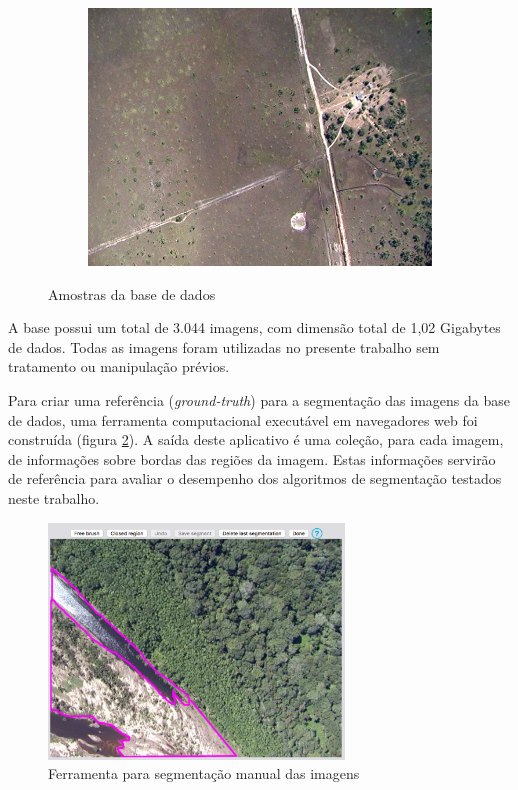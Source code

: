 \begin{figure}[h]
\begin{subfigure}[b]{0.3\textwidth}
    \includegraphics[width=\textwidth]{imgs/amostra3}
  \end{subfigure}%
  \caption{Amostras da base de dados}
  \label{fig:amostra}
\end{figure}

A base possui um total de 3.044 imagens, com dimensão total de 1,02 Gigabytes de dados. Todas as imagens foram utilizadas no presente trabalho sem tratamento ou manipulação prévios.

Para criar uma referência (\textit{ground-truth}) para a segmentação das imagens da base de dados, uma ferramenta computacional executável em navegadores web foi construída (figura \ref{fig:manualseg}). A saída deste aplicativo é uma coleção, para cada imagem, de informações sobre bordas das regiões da imagem. Estas informações servirão de referência para avaliar o desempenho dos algoritmos de segmentação testados neste trabalho.

\begin{figure}[h]
  \centering
  \includegraphics[width=0.7\textwidth]{imgs/manualseg}
  \caption{Ferramenta para segmentação manual das imagens}
  \label{fig:manualseg}
\end{figure}

